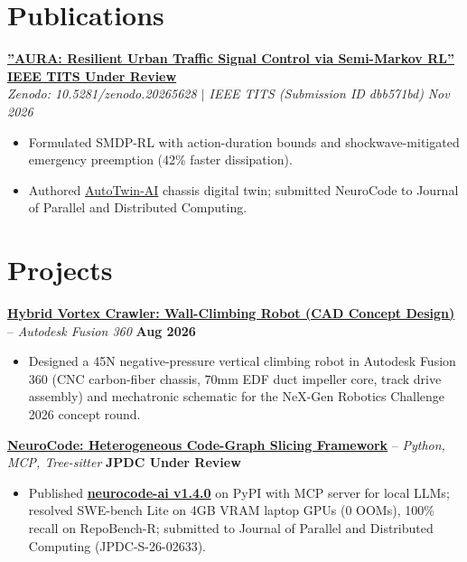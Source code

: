 \documentclass[letterpaper,10pt]{article}
\begin{document}
\section{Publications}
\noindent
\href{https://doi.org/10.5281/zenodo.20265628}{\textbf{''AURA: Resilient Urban Traffic Signal Control via Semi-Markov RL''}} \hfill \href{https://doi.org/10.5281/zenodo.20265628}{\textbf{IEEE TITS Under Review}} \\
\textit{Zenodo: 10.5281/zenodo.20265628 $|$ IEEE TITS (Submission ID dbb571bd)} \hfill \textit{Nov 2026} \\
\begin{itemize}
    \item Formulated SMDP-RL with action-duration bounds and shockwave-mitigated emergency preemption (42\% faster dissipation).
    \item Authored \href{https://deepak-arkz.me/projects/autotwin-ai}{AutoTwin-AI} chassis digital twin; submitted NeuroCode to Journal of Parallel and Distributed Computing.
\end{itemize}

\section{Projects}
\noindent
\href{https://github.com/Arkz-Deepak/vortex-crawler}{\textbf{Hybrid Vortex Crawler: Wall-Climbing Robot (CAD Concept Design)}} -- \textit{Autodesk Fusion 360} \hfill \textbf{Aug 2026} \\
\begin{itemize}
    \item Designed a 45N negative-pressure vertical climbing robot in Autodesk Fusion 360 (CNC carbon-fiber chassis, 70mm EDF duct impeller core, track drive assembly) and mechatronic schematic for the NeX-Gen Robotics Challenge 2026 concept round.
\end{itemize}
\vspace{3pt}

\noindent
\href{https://pypi.org/project/neurocode-ai/}{\textbf{NeuroCode: Heterogeneous Code-Graph Slicing Framework}} -- \textit{Python, MCP, Tree-sitter} \hfill \textbf{JPDC Under Review} \\
\begin{itemize}
    \item Published \href{https://pypi.org/project/neurocode-ai/}{\textbf{neurocode-ai v1.4.0}} on PyPI with MCP server for local LLMs; resolved SWE-bench Lite on 4GB VRAM laptop GPUs (0 OOMs), 100\% recall on RepoBench-R; submitted to Journal of Parallel and Distributed Computing (JPDC-S-26-02633).
\end{itemize}
\vspace{3pt}
\end{document}
